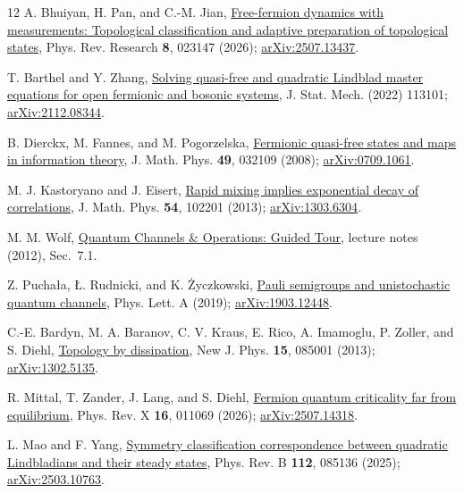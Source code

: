 \documentclass[aps,prb,twocolumn,nofootinbib,superscriptaddress]{revtex4-2}
\begin{document}
\begin{thebibliography}{12}
 A. Bhuiyan, H. Pan, and C.-M. Jian,
\href{https://doi.org/10.1103/nk38-ygyq}{Free-fermion dynamics with measurements:
Topological classification and adaptive preparation of topological states},
Phys. Rev. Research \textbf{8}, 023147 (2026);
\href{https://arxiv.org/abs/2507.13437}{arXiv:2507.13437}.

 T. Barthel and Y. Zhang,
\href{https://doi.org/10.1088/1742-5468/ac8e5c}{Solving quasi-free and quadratic
Lindblad master equations for open fermionic and bosonic systems},
J. Stat. Mech. (2022) 113101;
\href{https://arxiv.org/abs/2112.08344}{arXiv:2112.08344}.

 B. Dierckx, M. Fannes, and M. Pogorzelska,
\href{https://doi.org/10.1063/1.2841326}{Fermionic quasi-free states and maps
in information theory}, J. Math. Phys. \textbf{49}, 032109 (2008);
\href{https://arxiv.org/abs/0709.1061}{arXiv:0709.1061}.

 M. J. Kastoryano and J. Eisert,
\href{https://doi.org/10.1063/1.4822481}{Rapid mixing implies exponential
decay of correlations}, J. Math. Phys. \textbf{54}, 102201 (2013);
\href{https://arxiv.org/abs/1303.6304}{arXiv:1303.6304}.

 M. M. Wolf,
\href{https://mediatum.ub.tum.de/doc/1701036/document.pdf}{Quantum Channels
\& Operations: Guided Tour}, lecture notes (2012), Sec.~7.1.

 Z. Pucha\l{}a, \L{}. Rudnicki, and K. \.{Z}yczkowski,
\href{https://doi.org/10.1016/j.physleta.2019.04.057}{Pauli semigroups and
unistochastic quantum channels}, Phys. Lett. A (2019);
\href{https://arxiv.org/abs/1903.12448}{arXiv:1903.12448}.

 C.-E. Bardyn, M. A. Baranov, C. V. Kraus, E. Rico,
A. Imamoglu, P. Zoller, and S. Diehl,
\href{https://doi.org/10.1088/1367-2630/15/8/085001}{Topology by dissipation},
New J. Phys. \textbf{15}, 085001 (2013);
\href{https://arxiv.org/abs/1302.5135}{arXiv:1302.5135}.

 R. Mittal, T. Zander, J. Lang, and S. Diehl,
\href{https://doi.org/10.1103/nj2d-l6pz}{Fermion quantum criticality far
from equilibrium}, Phys. Rev. X \textbf{16}, 011069 (2026);
\href{https://arxiv.org/abs/2507.14318}{arXiv:2507.14318}.

 L. Mao and F. Yang,
\href{https://doi.org/10.1103/p8xr-4yzl}{Symmetry classification
correspondence between quadratic Lindbladians and their steady states},
Phys. Rev. B \textbf{112}, 085136 (2025);
\href{https://arxiv.org/abs/2503.10763}{arXiv:2503.10763}.


\end{thebibliography}
\end{document}
